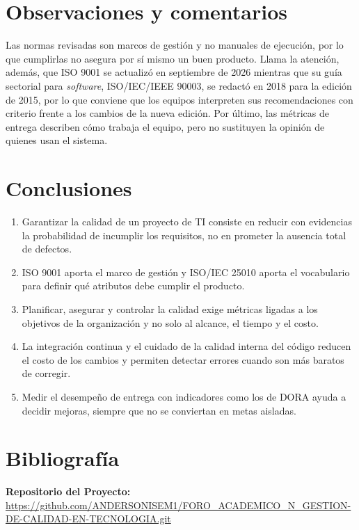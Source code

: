 \documentclass[12pt,letterpaper]{article}
\begin{document}
\section*{Observaciones y comentarios}
Las normas revisadas son marcos de gestión y no manuales de ejecución, por lo que cumplirlas no asegura por sí mismo un buen producto. Llama la atención, además, que ISO 9001 se actualizó en septiembre de 2026 mientras que su guía sectorial para \textit{software}, ISO/IEC/IEEE 90003, se redactó en 2018 para la edición de 2015, por lo que conviene que los equipos interpreten sus recomendaciones con criterio frente a los cambios de la nueva edición. Por último, las métricas de entrega describen cómo trabaja el equipo, pero no sustituyen la opinión de quienes usan el sistema.

\section*{Conclusiones}
\begin{enumerate}
  \item Garantizar la calidad de un proyecto de TI consiste en reducir con evidencias la probabilidad de incumplir los requisitos, no en prometer la ausencia total de defectos.
  \item ISO 9001 aporta el marco de gestión y ISO/IEC 25010 aporta el vocabulario para definir qué atributos debe cumplir el producto.
  \item Planificar, asegurar y controlar la calidad exige métricas ligadas a los objetivos de la organización y no solo al alcance, el tiempo y el costo.
  \item La integración continua y el cuidado de la calidad interna del código reducen el costo de los cambios y permiten detectar errores cuando son más baratos de corregir.
  \item Medir el desempeño de entrega con indicadores como los de DORA ayuda a decidir mejoras, siempre que no se conviertan en metas aisladas.
\end{enumerate}

\section*{Bibliografía}
\printbibliography[heading=none]
\nocite{*}

\bigskip
\noindent\textbf{Repositorio del Proyecto: }\url{https://github.com/ANDERSONISEM1/FORO_ACADEMICO_N_GESTION-DE-CALIDAD-EN-TECNOLOGIA.git}
\end{document}
